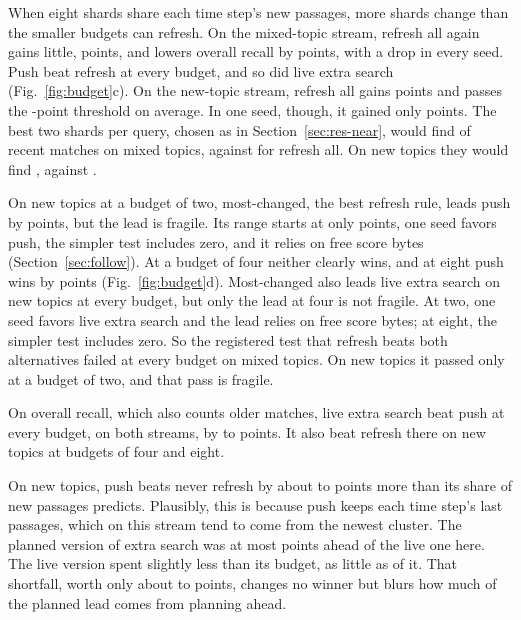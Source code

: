 When eight shards share each time step's new passages, more shards change than the smaller budgets can refresh.
On the mixed-topic stream, refresh all again gains little, \RNumPlainGateMThreeSteady{} points, and lowers overall recall by \RNumPlainGateMThreeOverallSteady{} points, with a drop in every seed.
Push beat refresh at every budget, and so did live extra search (Fig.~\ref{fig:budget}c).
On the new-topic stream, refresh all gains \RNumPlainGateMThreeNewTopic{} points and passes the \RNumPlainGateThreshold{}-point threshold on average.
In one seed, though, it gained only \RNumPlainGateMThreeMinSeedGap{} points.
The best two shards per query, chosen as in Section~\ref{sec:res-near}, would find \RNumPlainOracleMThreeSteadyPct{} of recent matches on mixed topics, against \RNumPlainLvlMThreeBFourAFSteady{} for refresh all.
On new topics they would find \RNumPlainOracleMThreeNewTopicPct{}, against \RNumPlainLvlMThreeBFourAFNewTopic{}.

On new topics at a budget of two, most-changed, the best refresh rule, leads push by \RNumPlainHFourBPVBTwoNewTopic{} points, but the lead is fragile.
Its range starts at only \RNumPlainHFourBPVBTwoNewTopicLow{} points, one seed favors push, the simpler test includes zero, and it relies on free score bytes (Section~\ref{sec:follow}).
At a budget of four neither clearly wins, and at eight push wins by \RNumPlainHFourBPVBEightNewTopic{} points (Fig.~\ref{fig:budget}d).
Most-changed also leads live extra search on new topics at every budget, but only the lead at four is not fragile.
At two, one seed favors live extra search and the lead relies on free score bytes; at eight, the simpler test includes zero.
So the registered test that refresh beats both alternatives failed at every budget on mixed topics.
On new topics it passed only at a budget of two, and that pass is fragile.

On overall recall, which also counts older matches, live extra search beat push at every budget, on both streams, by \RNumPlainESOPVOverallMin{} to \RNumPlainESOPVOverallMax{} points.
It also beat refresh there on new topics at budgets of four and eight.

On new topics, push beats never refresh by about \RNumMThreePVNewTopicExcessMin{} to \RNumPlainPVExcessMax{} points more than its share of new passages predicts.
Plausibly, this is because push keeps each time step's last passages, which on this stream tend to come from the newest cluster.
The planned version of extra search was at most \RNumPlainLookaheadMThreeMax{} points ahead of the live one here.
The live version spent slightly less than its budget, as little as \RNumMThreeESOShareOfRefreshBTwoNewTopic{} of it.
That shortfall, worth only about \RNumMThreeESOUnderspendValMin{} to \RNumPlainESOUnderspendMax{} points, changes no winner but blurs how much of the planned lead comes from planning ahead.

